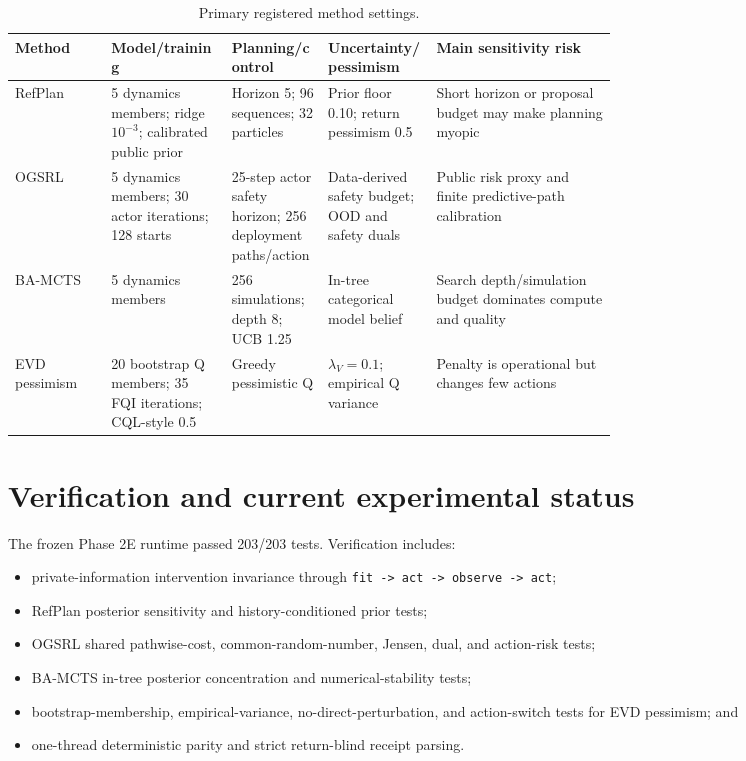 \documentclass[11pt,a4paper]{article}
\newcommand{\method}[1]{\texttt{#1}}
\begin{document}
\begin{landscape}
\begin{table}[p]
\centering
\small
\caption{Primary registered method settings.}
\begin{tabularx}{\linewidth}{P{0.16\linewidth}P{0.20\linewidth}P{0.16\linewidth}P{0.18\linewidth}Y}
\toprule
Method & Model/training & Planning/control & Uncertainty/pessimism & Main sensitivity risk \\
\midrule
RefPlan & 5 dynamics members; ridge $10^{-3}$; calibrated public prior & Horizon 5; 96 sequences; 32 particles & Prior floor 0.10; return pessimism 0.5 & Short horizon or proposal budget may make planning myopic \\
\addlinespace
OGSRL & 5 dynamics members; 30 actor iterations; 128 starts & 25-step actor safety horizon; 256 deployment paths/action & Data-derived safety budget; OOD and safety duals & Public risk proxy and finite predictive-path calibration \\
\addlinespace
BA-MCTS & 5 dynamics members & 256 simulations; depth 8; UCB 1.25 & In-tree categorical model belief & Search depth/simulation budget dominates compute and quality \\
\addlinespace
EVD pessimism & 20 bootstrap Q members; 35 FQI iterations; CQL-style 0.5 & Greedy pessimistic Q & $\lambda_V=0.1$; empirical Q variance & Penalty is operational but changes few actions \\
\bottomrule
\end{tabularx}
\end{table}
\end{landscape}

\section{Verification and current experimental status}

The frozen Phase 2E runtime passed 203/203 tests. Verification includes:

\begin{itemize}[leftmargin=*]
  \item private-information intervention invariance through
  \method{fit -> act -> observe -> act};
  \item RefPlan posterior sensitivity and history-conditioned prior tests;
  \item OGSRL shared pathwise-cost, common-random-number, Jensen, dual, and action-risk tests;
  \item BA-MCTS in-tree posterior concentration and numerical-stability tests;
  \item bootstrap-membership, empirical-variance, no-direct-perturbation, and action-switch tests
  for EVD pessimism; and
  \item one-thread deterministic parity and strict return-blind receipt parsing.
\end{itemize}
\end{document}
